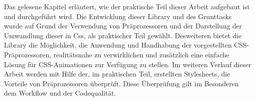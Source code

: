 Das gelesene Kapitel erläutert, wie der praktische Teil dieser Arbeit aufgebaut ist und durchgeführt wird.\newline
Die Entwicklung dieser Library und des Grunttasks wurde auf Grund der Verwendung von Präprozessoren und der Darstellung der  Umwandlung dieser in Css, als praktischer Teil gewählt. Desweiteren bietet die Library die Möglichkeit, die Anwendung und Handhabung der vorgestellten CSS-Präprozessoren, realitätsnahe zu verwirklichen und zusätzlich eine einfache Lösung für CSS-Animationen zur Verfügung zu stellen.\newline\newline
Im weiteren Verlauf dieser Arbeit werden mit Hilfe der, im praktischen Teil, erstellten Stylesheets, die Vorteile von Präprozessoren überprüft.\newline
Diese Überprüfung gilt im Besonderen dem Workflow und der Codequalität.
\newpage
